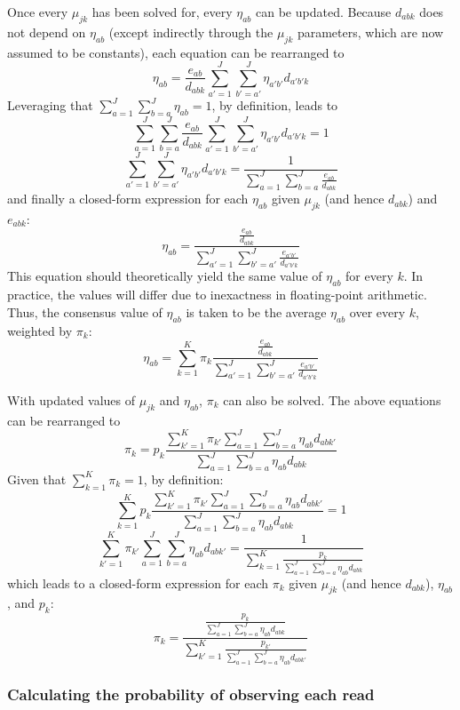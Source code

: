 \documentclass[11pt]{article}
\begin{document}
Once every $\mu_{jk}$ has been solved for, every $\eta_{ab}$ can be updated.
Because $d_{abk}$ does not depend on $\eta_{ab}$ (except indirectly through the $\mu_{jk}$ parameters, which are now assumed to be constants), each equation can be rearranged to
$$\eta_{ab} = \frac{e_{ab}}{d_{abk}} \sum_{a'=1}^{J} \sum_{b'=a'}^{J} \eta_{a'b'} d_{a'b'k}$$
Leveraging that $\sum_{a=1}^{J} \sum_{b=a}^{J} \eta_{ab} = 1$, by definition, leads to
$$\sum_{a=1}^{J} \sum_{b=a}^{J} \frac{e_{ab}}{d_{abk}} \sum_{a'=1}^{J} \sum_{b'=a'}^{J} \eta_{a'b'} d_{a'b'k} = 1$$
$$\sum_{a'=1}^{J} \sum_{b'=a'}^{J} \eta_{a'b'} d_{a'b'k} = \frac{1}{\sum_{a=1}^{J} \sum_{b=a}^{J} \frac{e_{ab}}{d_{abk}}}$$
and finally a closed-form expression for each $\eta_{ab}$ given $\mu_{jk}$ (and hence $d_{abk}$) and $e_{abk}$:
$$\eta_{ab} = \frac{\frac{e_{ab}}{d_{abk}}}{\sum_{a'=1}^{J} \sum_{b'=a'}^{J} \frac{e_{a'b'}}{d_{a'b'k}}}$$
This equation should theoretically yield the same value of $\eta_{ab}$ for every $k$.
In practice, the values will differ due to inexactness in floating-point arithmetic.
Thus, the consensus value of $\eta_{ab}$ is taken to be the average $\eta_{ab}$ over every $k$, weighted by $\pi_k$:
$$\eta_{ab} = \sum_{k=1}^{K} \pi_k \frac{\frac{e_{ab}}{d_{abk}}}{\sum_{a'=1}^{J} \sum_{b'=a'}^{J} \frac{e_{a'b'}}{d_{a'b'k}}}$$

With updated values of $\mu_{jk}$ and $\eta_{ab}$, $\pi_k$ can also be solved.
The above equations can be rearranged to
$$\pi_k = p_k \frac{\sum_{k'=1}^{K} \pi_{k'} \sum_{a=1}^{J} \sum_{b=a}^{J} \eta_{ab} d_{abk'}}{\sum_{a=1}^{J} \sum_{b=a}^{J} \eta_{ab} d_{abk}}$$
Given that $\sum_{k=1}^{K} \pi_k = 1$, by definition:
$$\sum_{k=1}^{K} p_k \frac{\sum_{k'=1}^{K} \pi_{k'} \sum_{a=1}^{J} \sum_{b=a}^{J} \eta_{ab} d_{abk'}}{\sum_{a=1}^{J} \sum_{b=a}^{J} \eta_{ab} d_{abk}} = 1$$
$$\sum_{k'=1}^{K} \pi_{k'} \sum_{a=1}^{J} \sum_{b=a}^{J} \eta_{ab} d_{abk'} = \frac{1}{\sum_{k=1}^{K} \frac{p_k}{\sum_{a=1}^{J} \sum_{b=a}^{J} \eta_{ab} d_{abk}}}$$
which leads to a closed-form expression for each $\pi_k$ given $\mu_{jk}$ (and hence $d_{abk}$), $\eta_{ab}$, and $p_k$:
$$\pi_k = \frac{\frac{p_k}{ \sum_{a=1}^{J} \sum_{b=a}^{J} \eta_{ab} d_{abk}}}{\sum_{k'=1}^{K} \frac{p_{k'}}{\sum_{a=1}^{J} \sum_{b=a}^{J} \eta_{ab} d_{abk'}}}$$

\subsubsection{Calculating the probability of observing each read}
\label{calc-read-probability}
\end{document}
